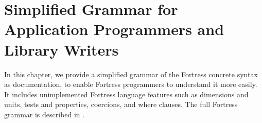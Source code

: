 %
%
%
%

\chapter{Simplified Grammar for Application Programmers and Library Writers}


In this chapter, we provide a simplified grammar of the Fortress concrete
syntax as documentation, to enable Fortress programmers to understand it
more easily.  It includes unimplemented Fortress language features
such as dimensions and units, tests and properties, coercions, and where
clauses.  The full Fortress grammar is described in .


